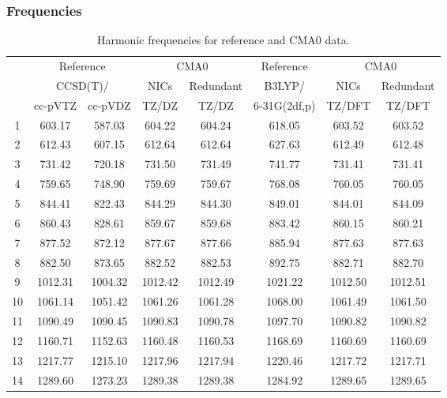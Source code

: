 \documentclass[10pt,oneside]{article}
\begin{document}
\begin{table}[h!]
\subsubsection*{Frequencies}
\centering
\caption{Harmonic frequencies for reference and CMA0 data.}
\begin{tabular}{cccccccc}
\toprule
{} & \multicolumn{2}{c}{Reference} & \multicolumn{2}{c}{CMA0} &    Reference & \multicolumn{2}{c}{CMA0} \\
{} & \multicolumn{2}{c}{CCSD(T)/} &    NICs &  Redundant &       B3LYP/ &    NICs & Redundant \\
{} &   cc-pVTZ & cc-pVDZ &   TZ/DZ &      TZ/DZ & 6-31G(2df,p) &  TZ/DFT &    TZ/DFT \\
\midrule
1  &    603.17 &  587.03 &  604.22 &     604.24 &       618.05 &  603.52 &    603.52 \\
2  &    612.43 &  607.15 &  612.64 &     612.64 &       627.63 &  612.49 &    612.48 \\
3  &    731.42 &  720.18 &  731.50 &     731.49 &       741.77 &  731.41 &    731.41 \\
4  &    759.65 &  748.90 &  759.69 &     759.67 &       768.08 &  760.05 &    760.05 \\
5  &    844.41 &  822.43 &  844.29 &     844.30 &       849.01 &  844.01 &    844.09 \\
6  &    860.43 &  828.61 &  859.67 &     859.68 &       883.42 &  860.15 &    860.21 \\
7  &    877.52 &  872.12 &  877.67 &     877.66 &       885.94 &  877.63 &    877.63 \\
8  &    882.50 &  873.65 &  882.52 &     882.53 &       892.75 &  882.71 &    882.70 \\
9  &   1012.31 & 1004.32 & 1012.42 &    1012.49 &      1021.22 & 1012.50 &   1012.51 \\
10 &   1061.14 & 1051.42 & 1061.26 &    1061.28 &      1068.00 & 1061.49 &   1061.50 \\
11 &   1090.49 & 1090.45 & 1090.83 &    1090.78 &      1097.70 & 1090.82 &   1090.82 \\
12 &   1160.71 & 1152.63 & 1160.48 &    1160.53 &      1168.69 & 1160.69 &   1160.69 \\
13 &   1217.77 & 1215.10 & 1217.96 &    1217.94 &      1220.46 & 1217.72 &   1217.71 \\
14 &   1289.60 & 1273.23 & 1289.38 &    1289.38 &      1284.92 & 1289.65 &   1289.65 \\

\end{tabular}
\end{table}
\end{document}
